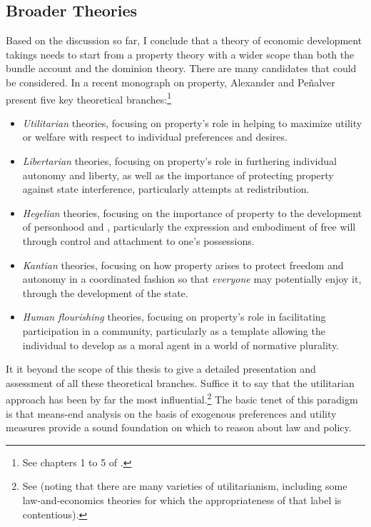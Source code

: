 \subsection{Broader Theories}\label{sec:2:3:2}

Based on the discussion so far, I conclude that a theory of economic development takings needs to start from a property theory with a wider scope than both the bundle account and the dominion theory. There are many candidates that could be considered. In a recent monograph on property, Alexander and Pe\~{n}alver present five key theoretical branches:\footnote{See chapters 1 to 5 of \cite{alexander12}.}
\begin{itemize}
\item {\it Utilitarian} theories, focusing on property's role in helping to maximize utility or welfare with respect to individual preferences and desires. 
\item {\it Libertarian} theories, focusing on property's role in furthering individual autonomy and liberty, as well as the importance of protecting property against state interference, particularly attempts at redistribution. 
\item {\it Hegelian} theories, focusing on the importance of property to the development of personhood and , particularly the expression and embodiment of free will through control and attachment to one's possessions.
\item {\it Kantian} theories, focusing on how property arises to protect freedom and autonomy in a coordinated fashion so that {\it everyone} may potentially enjoy it, through the development of the state.
\item {\it  Human flourishing} theories, focusing on property's role in facilitating participation in a community, particularly as a template allowing the individual to develop as a moral agent in a world of normative plurality.
\end{itemize}

It it beyond the scope of this thesis to give a detailed presentation and assessment of all these theoretical branches. Suffice it to say that the utilitarian approach has been by far the most influential.\footnote{See \cite[11]{alexander12} (noting that there are many varieties of utilitarianism, including some law-and-economics theories for which the appropriateness of that label is contentious).} The basic tenet of this paradigm is that means-end analysis on the basis of exogenous preferences and utility measures provide a sound foundation on which to reason about law and policy.

